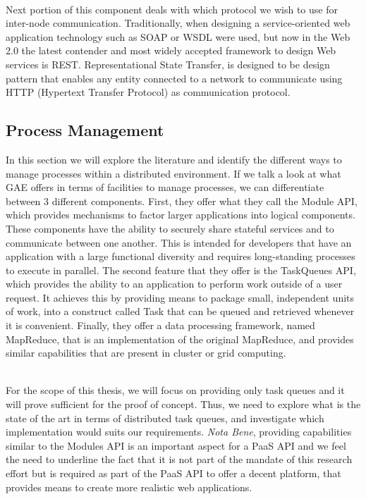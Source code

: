 \documentclass[11pt]{amsart}
\begin{document}
\begin{enumarate}
          \\ Next portion of this component deals with which protocol we wish to use for
          inter-node communication. Traditionally, when designing a service-oriented web
          application technology such as SOAP or WSDL were used, but now in the Web 2.0
          the latest contender and most widely accepted framework to design Web services
          is REST. Representational State Transfer, is designed to be design pattern that
          enables any entity connected to a network to communicate using HTTP (Hypertext
          Transfer Protocol) as communication protocol. %
          
          \subsection{Process Management}
          In this section we will explore the literature and identify the different ways
          to manage processes within a distributed environment. If we talk a look at what
          GAE offers in terms of facilities to manage processes, we can differentiate
          between 3 different components. First, they offer what they call the Module API,
          which provides mechanisms to factor larger applications into logical
          components. These components have the ability to securely share stateful
          services and to communicate between one another. This is intended for developers
          that have an application with a large functional diversity and requires
          long-standing processes to execute in parallel. The second feature that they
          offer is the TaskQueues API, which provides the ability to an application to
          perform work outside of a user request. It achieves this by providing means to
          package small, independent units of work, into a construct called Task that can
          be queued and retrieved whenever it is convenient. Finally, they offer a data
          processing framework, named MapReduce, that is an implementation of the original
          MapReduce, and provides similar capabilities that are present in cluster or grid
          computing.
          
          \\ For the scope of this thesis, we will focus on providing only task queues and
          it will prove sufficient for the proof of concept. Thus, we need to explore what
          is the state of the art in terms of distributed task queues, and investigate
          which implementation would suits our requirements. \emph{Nota Bene}, providing
          capabilities similar to the Modules API is an important aspect for a PaaS API
          and we feel the need to underline the fact that it is not part of the mandate of
          this research effort but is required as part of the PaaS API to offer a decent
          platform, that provides means to create more realistic web applications.


\end{enumarate}
\end{document}

